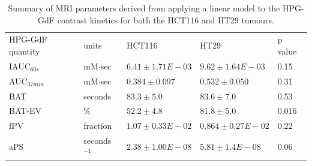 \begin{table}[htbp]
\begin{tabular}{@{}lllll@{}}
    \rowcolor{gray!50}
\acs{HPG-GdF} quantity & units     & HCT116           & HT29             & p value \\%
IAUC$_{60s}$  & mM$\cdot$sec    & $6.41\pm1.71 E-03$ & $9.62\pm1.64E-03$  & 0.15   \\
AUC$_{37min}$  & mM$\cdot$sec    & $0.384\pm0.097$    & $0.532\pm0.050$    & 0.31   \\
\acs{BAT}         & seconds   & $83.3\pm5.0$       & $83.6\pm7.0$       & 0.53   \\
BAT-EV      & \%         & $52.2\pm4.8$       & $81.8\pm5.0$       & 0.016 \\
\acs{fPV}         & fraction  & $1.07\pm0.33E-02$  & $0.864\pm0.27E-02$ & 0.22   \\
\acs{aPS}         & seconds$^{-1}$ & $2.38\pm1.00E-08$  & $5.81\pm1.4E-08$   & 0.06  %
\end{tabular}
\caption{Summary of MRI parameters derived from applying a linear model to the \acs{HPG-GdF} contrast kinetics for both the HCT116 and HT29 tumours.}
\label{hpgpaper:table3}
\end{table}


